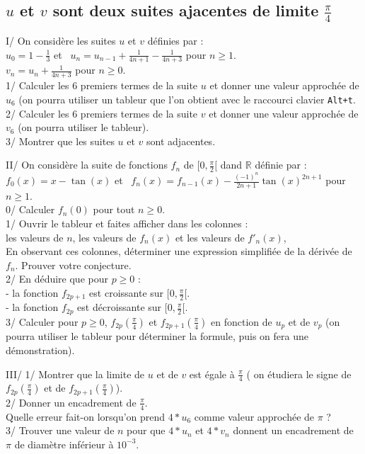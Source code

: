 \documentclass[a4paper,11pt]{book}
\begin{document}
\subsection{$u$ et $v$ sont deux suites ajacentes de limite $\displaystyle \frac{\pi}{4}$}
I/ On consid\`ere les suites $u$ et $v$ d\'efinies par :\\
$\displaystyle u_0=1-\frac{1}{3}$ et \ $\displaystyle u_{n}=u_{n-1}+\frac{1}{4n+1}-\frac{1}{4n+3}$ pour $n \geq 1$.\\
$\displaystyle v_n=u_n+\frac{1}{4n+3}$ pour $n \geq 0$.\\
1/ Calculer les 6 premiers termes de la suite $u$ et donner une valeur 
approch\'ee de $u_6$ (on pourra utiliser un tableur que l'on obtient avec le 
raccourci clavier {\tt Alt+t}.\\
2/ Calculer les 6 premiers termes de la suite $v$ et donner une valeur 
approch\'ee de $v_6$ (on pourra utiliser le tableur).\\
3/ Montrer que les suites $u$ et $v$ sont adjacentes.

II/ 
On consid\`ere la suite de fonctions $f_n$ de $[0,\frac{\pi}{2}[$ dand $\mathbb{R}$ d\'efinie par :\\
$f_0(x)=x-\tan(x)$ et \ 
$\displaystyle f_{n}(x)=f_{n-1}(x)-\frac{(-1)^n}{2n+1}\tan(x)^{2n+1}$ pour $n \geq 1$.\\
0/ Calculer  $f_n(0)$ pour tout $n \geq 0$.\\
1/ Ouvrir le tableur et faites afficher dans les colonnes :\\
les valeurs de $n$, les valeurs de $f_n(x)$ et les valeurs de $f'_n(x)$,\\
En observant ces colonnes, d\'eterminer une expression simplifi\'ee de la d\'eriv\'ee de $f_n$. Prouver votre conjecture.\\
2/ En d\'eduire que pour $p \geq 0$ :\\
- la fonction  $f_{2p+1}$ est croissante sur $[0,\frac{\pi}{2}[$.\\ 
- la fonction  $f_{2p}$ est d\'ecroissante sur $[0,\frac{\pi}{2}[$.\\
3/ Calculer pour $p \geq 0$,  $\displaystyle f_{2p}(\frac{\pi}{4})$  et
 $\displaystyle f_{2p+1}(\frac{\pi}{4})$ en fonction de $u_p$ et de $v_p$ 
(on pourra utiliser le tableur pour d\'eterminer la formule, puis on fera 
une d\'emonstration).

III/  1/ Montrer que la limite de $u$ et de $v$ est \'egale \`a $\frac{\pi}{4}$
( on \'etudiera le signe de $f_{2p}(\frac{\pi}{4})$ et de 
 $f_{2p+1}(\frac{\pi}{4})$).\\
2/ Donner un encadrement de $\frac{\pi}{4}$.\\
Quelle erreur fait-on lorsqu'on prend $4*u_6$ comme valeur approch\'ee de 
$\pi$ ?\\
3/ Trouver une valeur de $n$ pour que $4*u_n$ et $4*v_n$ donnent un encadrement de $\pi$ de diam\`etre inf\'erieur \`a $10^{-3}$.
\end{document}

